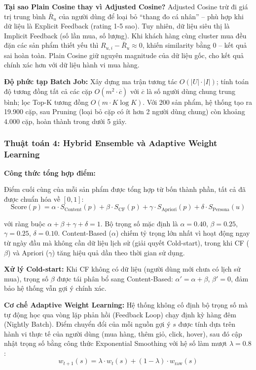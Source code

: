 \documentclass[12pt,a4paper]{report}
\begin{document}
\textbf{Tại sao Plain Cosine thay vì Adjusted Cosine?} Adjusted Cosine trừ đi giá trị trung bình $\bar{R}_u$ của người dùng để loại bỏ ``thang đo cá nhân'' -- phù hợp khi dữ liệu là Explicit Feedback (rating 1-5 sao). Tuy nhiên, dữ liệu siêu thị là Implicit Feedback (số lần mua, số lượng). Khi khách hàng cùng cluster mua đều đặn các sản phẩm thiết yếu thì $R_{u,i} - \bar{R}_u \approx 0$, khiến similarity bằng 0 -- kết quả sai hoàn toàn. Plain Cosine giữ nguyên magnitude của dữ liệu gốc, cho kết quả chính xác hơn với dữ liệu hành vi mua hàng.
 
\textbf{Độ phức tạp Batch Job:} Xây dựng ma trận tương tác $O(|U| \cdot |I|)$; tính toán độ tương đồng tất cả các cặp $O(m^2 \cdot \overline{c})$ với $\overline{c}$ là số người dùng chung trung bình; lọc Top-K tương đồng $O(m \cdot K \log K)$. Với 200 sản phẩm, hệ thống tạo ra 19.900 cặp, sau Pruning (loại bỏ cặp có ít hơn 2 người dùng chung) còn khoảng 4.000 cặp, hoàn thành trong dưới 5 giây.
 
\subsubsection{Thuật toán 4: Hybrid Ensemble và Adaptive Weight Learning}
 
\textbf{Công thức tổng hợp điểm:}
 
Điểm cuối cùng của mỗi sản phẩm được tổng hợp từ bốn thành phần, tất cả đã được chuẩn hóa về $[0, 1]$:
\[
\text{Score}(p) = \alpha \cdot S_{\text{Content}}(p) + \beta \cdot S_{\text{CF}}(p) + \gamma \cdot S_{\text{Apriori}}(p) + \delta \cdot S_{\text{Persona}}(u)
\]
 
với ràng buộc $\alpha + \beta + \gamma + \delta = 1$. Bộ trọng số mặc định là $\alpha = 0.40$, $\beta = 0.25$, $\gamma = 0.25$, $\delta = 0.10$. Content-Based ($\alpha$) chiếm tỷ trọng lớn nhất vì hoạt động ngay từ ngày đầu mà không cần dữ liệu lịch sử (giải quyết Cold-start), trong khi CF ($\beta$) và Apriori ($\gamma$) tăng hiệu quả dần theo thời gian sử dụng.
 
\textbf{Xử lý Cold-start:} Khi CF không có dữ liệu (người dùng mới chưa có lịch sử mua), trọng số $\beta$ được tái phân bổ sang Content-Based: $\alpha' = \alpha + \beta$, $\beta' = 0$, đảm bảo hệ thống vẫn gợi ý chính xác.
 
\textbf{Cơ chế Adaptive Weight Learning:} Hệ thống không cố định bộ trọng số mà tự động học qua vòng lặp phản hồi (Feedback Loop) chạy định kỳ hàng đêm (Nightly Batch). Điểm chuyển đổi của mỗi nguồn gợi ý $s$ được tính dựa trên hành vi thực tế của người dùng (mua hàng, thêm giỏ, click, hover), sau đó cập nhật trọng số bằng công thức Exponential Smoothing với hệ số làm mượt $\lambda = 0.8$:
\[
w_{t+1}(s) = \lambda \cdot w_t(s) + (1 - \lambda) \cdot w_{\text{raw}}(s)
\]
 
\end{document}

